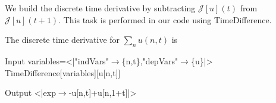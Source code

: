 \documentclass[runningheads]{llncs}
\newcommand{\1}{\chi}
\begin{document}
We build the discrete time derivative by subtracting \(\mathcal{J}[u](t)\) from \(\mathcal{J}[u](t+1)\). This task is performed in our code using {\sc TimeDifference}.
\begin{example}
	The discrete time derivative for \(\sum_n u(n,t)\) is
	
	
	\begin{small}
		\begin{mmaCell}[moredefined={variables, expression, TimeDifference}]{Input}
  variables=<|"indVars"\(\pmb{\to}\)\{n,t\},"depVars"\(\pmb{\to}\)\{u\}|>
  TimeDifference[variables][u[n,t]]
  
\end{mmaCell}
		\begin{mmaCell}{Output}
  <|exp\(\to\)-u[n,t]+u[n,1+t]|>
\end{mmaCell}
	\end{small}
\end{example}
	
\end{document}
